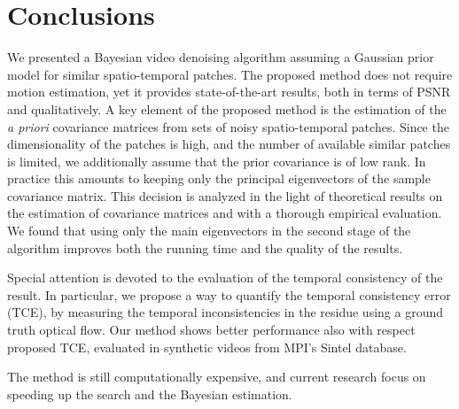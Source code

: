 \documentclass[10pt, a4paper]{article}
\begin{document}
\section{Conclusions}
\label{sec:conclusion}

We presented a Bayesian video denoising algorithm assuming a Gaussian prior
model for similar spatio-temporal patches. 
The proposed method does not require motion estimation, yet it provides 
state-of-the-art results, both in terms of PSNR and qualitatively. 
A key element of the proposed method is the estimation of the \textit{a priori}
covariance matrices from sets of noisy spatio-temporal patches. Since
the dimensionality of the patches is high, and the number of available 
similar patches is limited, we additionally assume that the prior covariance
is of low rank. In practice this amounts to keeping only the principal 
eigenvectors of the sample covariance matrix. This decision is analyzed
in the light of theoretical results on the estimation of covariance matrices 
and with a thorough empirical evaluation. We found that using only the 
main eigenvectors in the second stage of the algorithm improves both
the running time and the quality of the results.

Special attention is devoted to the evaluation of the temporal consistency of
the result. In particular, we propose a way to quantify the temporal
consistency error (TCE), by measuring the temporal inconsistencies in the
residue using a ground truth optical flow. Our method shows better performance
also with respect proposed TCE, evaluated in synthetic videos from MPI's Sintel
database.

The method is still computationally expensive, and current research focus
on speeding up the search and the Bayesian estimation.

%
%



\end{document}
